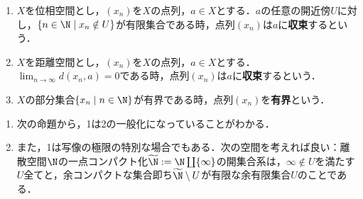 \documentclass[uplatex,dvipdfmx]{jsreport}
\begin{document}
\begin{definition}[convergence]\label{def-convergence}\mbox{}
    \begin{enumerate}
        \item $X$を位相空間とし，$(x_n)$を$X$の点列，$a\in X$とする．$a$の任意の開近傍$U$に対し，$\{n\in\N\mid x_n\notin U\}$が有限集合である時，点列$(x_n)$は$a$に\textbf{収束}するという．
        \item $X$を距離空間とし，$(x_n)$を$X$の点列，$a\in X$とする．$\lim_{n\to\infty}d(x_n,a)=0$である時，点列$(x_n)$は$a$に\textbf{収束}するという．
        \item $X$の部分集合$\{x_n\mid n\in\N\}$が有界である時，点列$(x_n)$を\textbf{有界}という．
    \end{enumerate}
\end{definition}

\begin{remark}\mbox{}
    \begin{enumerate}
        \item 次の命題から，1は2の一般化になっていることがわかる．
        \item また，1は写像の極限の特別な場合でもある．次の空間を考えれば良い：離散空間$\N$の一点コンパクト化$\widetilde{\N}:=\N\coprod\{\infty\}$の開集合系は，$\infty\notin U$を満たす$U$全てと，余コンパクトな集合即ち$\widetilde{\N}\setminus U$が有限な余有限集合$U$のことである．
    \end{enumerate}
\end{remark}
\end{document}
